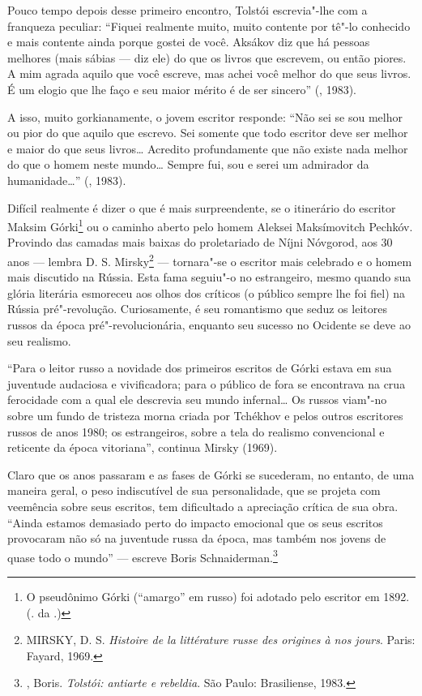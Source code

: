 Pouco tempo depois desse primeiro encontro, Tolstói escrevia"-lhe
com a franqueza peculiar: ``Fiquei realmente muito, muito contente
por tê"-lo conhecido e mais contente ainda porque gostei de você.
Aksákov diz que há pessoas melhores (mais sábias --- diz ele) do
que os livros que escrevem, ou então piores. A mim agrada aquilo
que você escreve, mas achei você melhor do que seus livros. É um
elogio que lhe faço e seu maior mérito é de ser sincero''
(, 1983).

A isso, muito gorkianamente, o jovem escritor responde: ``Não sei
se sou melhor ou pior do que aquilo que escrevo. Sei somente que
todo escritor deve ser melhor e maior do que seus livros\ldots{}
Acredito profundamente que não existe nada melhor do que o homem
neste mundo\ldots{} Sempre fui, sou e serei um admirador da
humanidade\ldots{}'' (, 1983).

Difícil realmente é dizer o que é mais surpreendente, se o
itinerário do escritor Maksim Górki\footnote{O pseudônimo Górki
(``amargo'' em russo) foi adotado pelo escritor em 1892.
(. da .)} ou o caminho aberto pelo homem Aleksei
Maksímovitch Pechkóv. Provindo das camadas mais baixas do
proletariado de Níjni Nóvgorod, aos 30 anos --- lembra D. S.
Mirsky\footnote{\scalebox{0.8} {MIRSKY}, D. S. \emph{Histoire de la
littérature russe des origines à nos jours}. Paris: Fayard,
1969.} --- tornara"-se o escritor mais celebrado e o homem mais
discutido na Rússia. Esta fama seguiu"-o no estrangeiro, mesmo
quando sua glória literária esmoreceu aos olhos dos críticos (o
público sempre lhe foi fiel) na Rússia pré"-revolução. Curiosamente,
é seu romantismo que seduz os leitores russos da época pré"-revolucionária,
enquanto seu sucesso no Ocidente se deve ao seu realismo.

``Para o leitor russo a novidade dos primeiros escritos de Górki
estava em sua juventude audaciosa e vivificadora; para o público
de fora se encontrava na crua ferocidade com a qual ele descrevia
seu mundo infernal\ldots{} Os russos viam"-no sobre um fundo de
tristeza morna criada por Tchékhov e pelos outros escritores
russos de anos 1980; os estrangeiros, sobre a tela do realismo
convencional e reticente da época vitoriana'', continua Mirsky
(1969).

Claro que os anos passaram e as fases de Górki se sucederam, no
entanto, de uma maneira geral, o peso indiscutível de sua
personalidade, que se projeta com veemência sobre seus escritos,
tem dificultado a apreciação crítica de sua obra. ``Ainda estamos
demasiado perto do impacto emocional que os seus escritos provocaram
não só na juventude russa da época, mas também nos jovens de quase
todo o mundo'' --- escreve Boris Schnaiderman.\footnote{,
Boris. \emph{Tolstói: antiarte e rebeldia}. São Paulo:
Brasiliense, 1983.}

